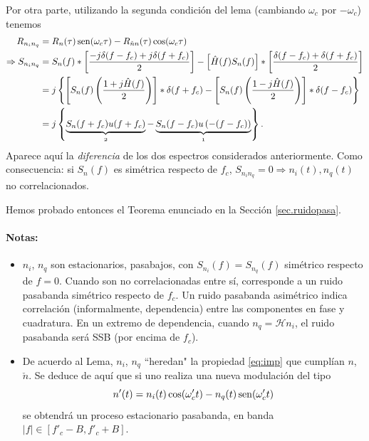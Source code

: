\noindent Por otra parte, utilizando la segunda condición del lema (cambiando
$\omega_c$ por $-\omega_c$) tenemos
\begin{align*}
    R_{n_in_q} & =R_n(\tau)\sen(\omega_c\tau)-R_{\check{n}n}(\tau)\cos(\omega_c\tau)\\
    \Rightarrow %
                    S_{n_in_q}  & = S_n(f) \ast \left[\frac{-j\delta(f-f_c)+j\delta(f+f_c)}{2}\right] - \left[\hat{H}(f)S_n(f)\right] \ast \left[\frac{\delta(f-f_c)+\delta(f+f_c)}{2}\right]\\
                            & = j \left\lbrace\left[S_n(f)\left(\frac{1+j\hat{H}(f)}{2}\right)\right] \ast \delta(f+f_c) - \left[S_n(f)\left(\frac{1-j\hat{H}(f)}{2}\right)\right] \ast \delta(f-f_c)\right\rbrace\\
                            & = j \left\lbrace\underbrace{S_n(f+f_c)u(f+f_c)}_{\oldstylenums{2}}-
                            \underbrace{S_n(f-f_c)u\left(-(f-f_c)\right)}_{\oldstylenums{1}}\right\rbrace.
\end{align*}
Aparece aquí la {\em diferencia} de los dos espectros
considerados anteriormente. Como consecuencia: si $S_n(f)$ es simétrica respecto de $f_c$, 
$S_{n_in_q}=0 \Rightarrow n_i(t), n_q(t)$ no correlacionados.

Hemos probado entonces el Teorema enunciado en la Sección \ref{sec.ruidopasa}. 

\paragraph{Notas:} 
\begin{itemize}
\item  $n_i$, $n_q$ son estacionarios, pasabajos, con
$S_{n_i}(f)=S_{n_q}(f)$ simétrico respecto de $f=0$. Cuando son no
correlacionadas entre sí, corresponde a un ruido pasabanda 
simétrico respecto de $f_c$. Un ruido pasabanda asimétrico indica correlación
(informalmente, dependencia) entre las componentes en fase y
cuadratura. En un extremo de dependencia, cuando
$n_q=\mathcal{H}{n_i}$, el ruido pasabanda será SSB (por encima de
$f_c$).%
\item De acuerdo al Lema, $n_i$, $n_q$
``heredan" la propiedad \eqref{eq:imp} que cumplían $n$,
$\check{n}$. Se deduce de aquí que si uno realiza una nueva modulación del tipo 
\[n'(t)=n_i(t)\cos(\omega'_ct)-n_q(t)\operatorname{sen}(\omega'_ct)\]
se obtendrá un proceso estacionario pasabanda, en banda
$|f|\in[f'_c-B,f'_c+B]$. 
\end{itemize}

%


